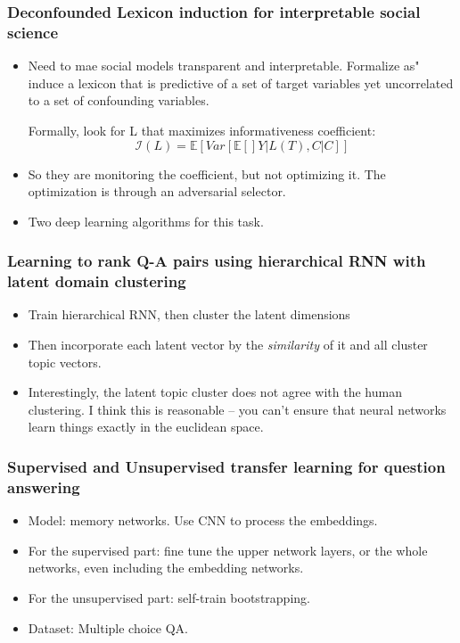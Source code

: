 \subsubsection{Deconfounded Lexicon induction for interpretable social science \cite{Pryzant2018Deconfounded}}
\begin{itemize}
	\item Need to mae social models transparent and interpretable. Formalize as" induce a lexicon that is predictive of a set of target variables yet uncorrelated to a set of confounding variables.
	
	Formally, look for L that maximizes informativeness coefficient: 
	\[\mathcal{I}(L) = \mathbb{E} [Var [\mathbb{E}[]Y|L(T), C  | C]] \]
	\item So they are monitoring the coefficient, but not optimizing it. The optimization is through an adversarial selector.
	\item Two deep learning algorithms for this task. 
\end{itemize}


\subsubsection{Learning to rank Q-A pairs using hierarchical RNN with latent domain clustering}
\begin{itemize}
	\item Train hierarchical RNN, then cluster the latent dimensions
	\item Then incorporate each latent vector by the \emph{similarity} of it and all cluster topic vectors. 
	\item Interestingly, the latent topic cluster does not agree with the human clustering. I think this is reasonable -- you can't ensure that neural networks learn things exactly in the euclidean space.
\end{itemize}

\subsubsection{Supervised and Unsupervised transfer learning for question answering \cite{Chung2018Supervised}}
\begin{itemize}
	\item Model: memory networks. Use CNN to process the embeddings.
	\item For the supervised part: fine tune the upper network layers, or the whole networks, even including the embedding networks.
	\item For the unsupervised part: self-train bootstrapping.
	\item Dataset: Multiple choice QA.
\end{itemize}

